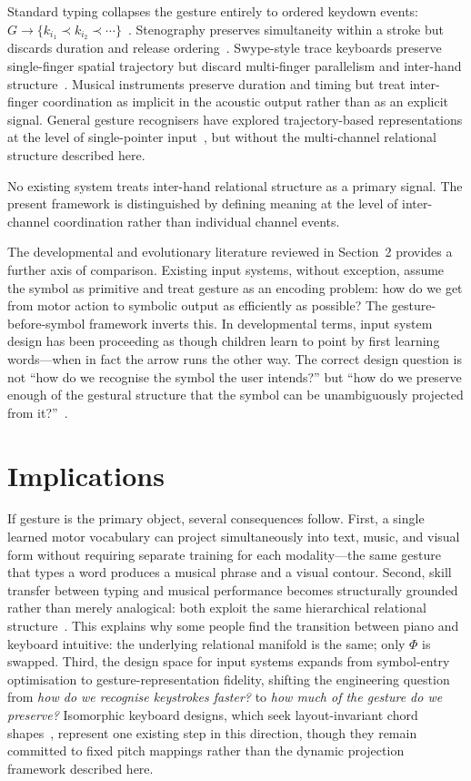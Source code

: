 \documentclass[11pt, a4paper]{article}
\begin{document}
Standard typing collapses the gesture entirely to ordered keydown
events: $G \to \{k_{i_1} \prec k_{i_2} \prec \cdots\}$~\cite{mackenzie2002}.
Stenography preserves simultaneity within a stroke but discards duration
and release ordering~\cite{plover}. Swype-style trace keyboards preserve
single-finger spatial trajectory but discard multi-finger parallelism and
inter-hand structure~\cite{zhai2012}. Musical instruments preserve
duration and timing but treat inter-finger coordination as implicit in
the acoustic output rather than as an explicit signal. General gesture
recognisers have explored trajectory-based representations at the level
of single-pointer input~\cite{wobbrock2007}, but without the
multi-channel relational structure described here.

No existing system treats inter-hand relational structure as a primary
signal. The present framework is distinguished by defining meaning at the
level of inter-channel coordination rather than individual channel events.

The developmental and evolutionary literature reviewed in Section~2
provides a further axis of comparison. Existing input systems, without
exception, assume the symbol as primitive and treat gesture as an encoding
problem: how do we get from motor action to symbolic output as efficiently
as possible? The gesture-before-symbol framework inverts this. In
developmental terms, input system design has been proceeding as though
children learn to point by first learning words---when in fact the
arrow runs the other way. The correct design question is not ``how do we
recognise the symbol the user intends?'' but ``how do we preserve enough
of the gestural structure that the symbol can be unambiguously projected
from it?''~\cite{iverson2005gesture,goldin2003gesture}.

\section{Implications}

If gesture is the primary object, several consequences follow. First, a
single learned motor vocabulary can project simultaneously into text,
music, and visual form without requiring separate training for each
modality---the same gesture that types a word produces a musical phrase
and a visual contour. Second, skill transfer between typing and musical
performance becomes structurally grounded rather than merely analogical:
both exploit the same hierarchical relational structure~\cite{schieber2001}.
This explains why some people find the transition between piano and
keyboard intuitive: the underlying relational manifold is the same; only
$\Phi$ is swapped. Third, the design space for input systems expands from
symbol-entry optimisation to gesture-representation fidelity, shifting
the engineering question from \emph{how do we recognise keystrokes
faster?} to \emph{how much of the gesture do we preserve?} Isomorphic
keyboard designs, which seek layout-invariant chord
shapes~\cite{lumatone}, represent one existing step in this direction,
though they remain committed to fixed pitch mappings rather than the
dynamic projection framework described here.
\end{document}
